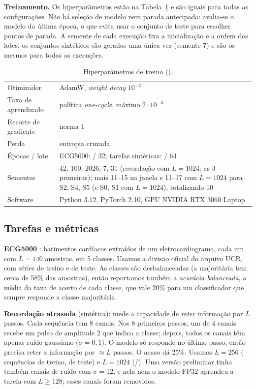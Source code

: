 \documentclass[12pt]{article}
\begin{document}
\textbf{Treinamento.} Os hiperparâmetros estão na Tabela~\ref{tab:hparams} e são iguais para todas as configurações. Não há seleção de modelo nem parada antecipada: avalia-se o modelo da última época, o que evita usar o conjunto de teste para escolher pontos de parada. A semente de cada execução fixa a inicialização e a ordem dos lotes; os conjuntos sintéticos são gerados uma única vez (semente 7) e são os mesmos para todas as execuções.

\begin{table}[htb]
\centering
\caption{Hiperparâmetros de treino ().}
\label{tab:hparams}
\footnotesize
\begin{tabular}{ll}
\toprule
Otimizador & AdamW, \emph{weight decay} $10^{-2}$ \\
Taxa de aprendizado & política \emph{one-cycle}, máximo $2\cdot10^{-3}$ \\
Recorte de gradiente & norma 1 \\
Perda & entropia cruzada \\
Épocas / lote & ECG5000: \EpochsEcg{} / 32; tarefas sintéticas: \EpochsCueA{} / 64 \\
Sementes & 42, 100, 2026, 7, 31 (recordação com $L=1024$: as 3 primeiras); mais 11--15 na janela e 11--17 com $L=1024$ para S2, S4, S5 (e S0, S1 com $L=1024$), totalizando 10 \\
Software & Python 3.12, PyTorch 2.10, GPU NVIDIA RTX 3060 Laptop \\
\bottomrule
\end{tabular}
\end{table}

\subsection{Tarefas e métricas}
\textbf{ECG5000} \cite{ecg5000}: batimentos cardíacos extraídos de um eletrocardiograma, cada um com $L=140$ amostras, em 5 classes. Usamos a divisão oficial do arquivo UCR, com \TrainEcg{} séries de treino e \TestEcg{} de teste. As classes são desbalanceadas (a majoritária tem cerca de 58\% das amostras), então reportamos também a \emph{acurácia balanceada}, a média da taxa de acerto de cada classe, que vale 20\% para um classificador que sempre responde a classe majoritária.

\textbf{Recordação atrasada} (sintética): mede a capacidade de \emph{reter} informação por $L$ passos. Cada sequência tem 8 canais. Nos 8 primeiros passos, um de 4 canais recebe um pulso de amplitude 2 que indica a classe; depois, todos os canais têm apenas ruído gaussiano ($\sigma = 0{,}1$). O modelo só responde no último passo, então precisa reter a informação por $\approx L$ passos. O acaso dá 25\%. Usamos $L=256$ (\TrainCueA{} sequências de treino, \TestCueA{} de teste) e $L=1024$ (\TrainCueB{}/\TestCueB{}). Uma versão preliminar tinha também canais de ruído com $\sigma=12$, e nela nem o modelo FP32 aprendeu a tarefa com $L\geq128$; esses canais foram removidos.
\end{document}
